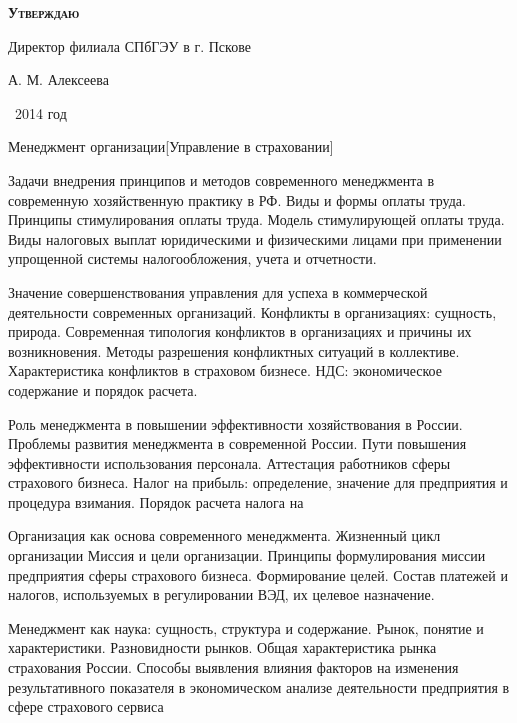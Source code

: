\documentclass[
	11pt,
	a4paper,
	]
	{article}
\begin{document}
\newlength{\pblength}\settowidth{\pblength}{Директор филиала СПбГЭУ в г. Пскове}

\hfill\parbox{\pblength}{
	\textbf{\textsc{Утверждаю}}\medskip

	Директор филиала СПбГЭУ в г. Пскове\medskip

	\makebox[3cm]{\hrulefill} А. М. Алексеева\medskip

	\makebox[1.5cm]{<<\hrulefill>>} \makebox[3cm]{\hrulefill}\ 2014 год
}


 {Менеджмент организации}[Управление в страховании]

	

\noindent{} 
	{
		Задачи внедрения принципов и методов современного менеджмента в современную хозяйственную практику в РФ.
	}{
		Виды и формы оплаты труда. Принципы стимулирования оплаты труда. Модель стимулирующей оплаты труда.
	}{
		Виды налоговых выплат юридическими и физическими лицами при применении упрощенной системы налогообложения, учета и отчетности.
	}

\bigskip

\noindent{} 
	{
		Значение совершенствования управления для успеха в коммерческой деятельности современных организаций.
	}{
		Конфликты в организациях: сущность, природа. Современная типология конфликтов в организациях и причины их возникновения. Методы разрешения конфликтных ситуаций в коллективе. Характеристика конфликтов в страховом бизнесе.
	}{
		НДС: экономическое содержание и порядок расчета.
	}

\bigskip

\noindent{} 
	{
		Роль менеджмента в повышении эффективности хозяйствования в России. Проблемы развития менеджмента в современной России.
	}{
		Пути повышения эффективности использования персонала. Аттестация работников сферы страхового бизнеса.
	}{
		Налог на прибыль: определение, значение для предприятия и процедура взимания. Порядок расчета налога на
	}

\bigskip

\noindent{} 
	{
		Организация как основа современного менеджмента. Жизненный цикл организации
	}{
		Миссия и цели организации. Принципы формулирования миссии предприятия сферы страхового бизнеса. Формирование целей.
	}{
		Состав платежей и налогов, используемых в регулировании ВЭД, их целевое назначение.
	}

\bigskip

\noindent{} 
	{
		Менеджмент как наука: сущность, структура и содержание.
	}{
		Рынок, понятие и характеристики. Разновидности рынков. Общая характеристика рынка страхования России.
	}{
		Способы выявления влияния факторов на изменения результативного показателя в экономическом анализе деятельности предприятия в сфере страхового сервиса
	}
\end{document}
